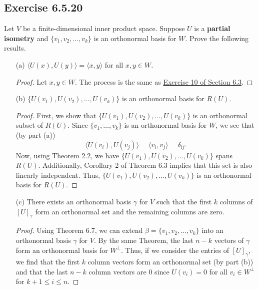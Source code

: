\subsection*{Exercise 6.5.20} 
Let \( V  \) be a finite-dimensional inner product space. Suppose \( U  \) is a \textbf{partial isometry} and \( \{ {v}_{1}, {v}_{2}, \dots, {v}_{k} \}   \) is an orthonormal basis for \( W  \). Prove the following results.
\begin{enumerate}
    \item[(a)] \( \langle U(x) , U(y) \rangle = \langle x , y \rangle \) for all \( x, y \in W  \).
        \begin{proof}
        Let \( x,y \in W  \). The process is the same as {\hyperref[Exercise 6.3.10]{Exercise 10 of Section 6.3}}. 
        \end{proof}
    \item[(b)] \( \{ U({v}_{1}), U({v}_{2}), \dots, U({v}_{k}) \}  \) is an orthonormal basis for \( R(U) \).
        \begin{proof}
        First, we show that \( \{ U({v}_{1}), U({v}_{2}), \dots, U({v}_{k}) \}  \) is an orthonormal subset of \( R(U)  \). Since \( \{ {v}_{1}, \dots, {v}_{k} \}  \) is an orthonormal basis for \( W  \), we see that (by part (a))
        \[  \langle U({v}_{i}) , U({v}_{j}) \rangle = \langle {v}_{i} ,  {v}_{j} \rangle = {\delta}_{ij}. \]
        Now, using Theorem 2.2, we have \( \{ U({v}_{1}), U({v}_{2}), \dots, U({v}_{k}) \}  \) spans \( R(U) \). Additionally, Corollary 2 of Theorem 6.3 implies that this set is also linearly independent. Thus, \( \{ U({v}_{1}), U({v}_{2}), \dots, U({v}_{k}) \}  \) is an orthonormal basis for \( R(U)  \).
        \end{proof}
    \item[(c)] There exists an orthonormal basis \( \gamma \) for \( V  \) such that the first \( k  \) columns of \( [U]_{\gamma} \) form an orthonormal set and the remaining columns are zero. 
        \begin{proof}
            Using Theorem 6.7, we can extend \( \beta = \{ {v}_{1}, {v}_{2}, \dots, {v}_{k} \}  \) into an orthonormal basis \( \gamma \) for \( V  \). By the same Theorem, the last \( n - k  \) vectors of \( \gamma \) form an orthonormal basis for \( W^{\perp} \). Thus, if we consider the entries of \( [U]_{\gamma} \), we find that the first \( k  \) column vectors form an orthonormal set (by part (b)) and that the last \( n - k  \) column vectors are \( 0  \) since \( U({v}_{i}) = 0  \) for all \( {v}_{i} \in W^{\perp} \) for \( k+1 \leq i \leq n  \). 

\end{proof}
\end{enumerate}
